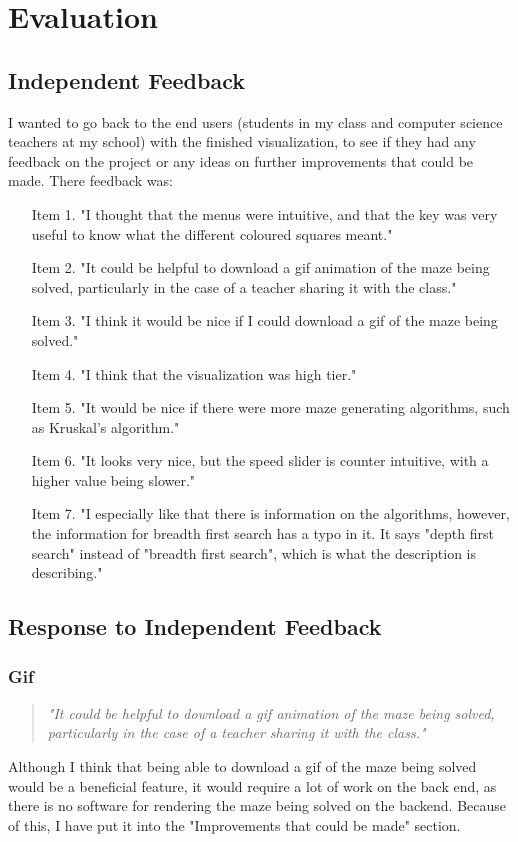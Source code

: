 \documentclass[titlepage]{article}
\begin{document}
\section{Evaluation}
\subsection{Independent Feedback}
I wanted to go back to the end users (students in my class and computer science teachers at my school) with the finished visualization, to see if they had any feedback on the project or any ideas on further improvements that could be made.
There feedback was:
\begin{itemize}
    \item[Item 1.]"I thought that the menus were intuitive, and that the key was very useful to know what the different coloured squares meant."
    \item[Item 2.]"It could be helpful to download a gif animation of the maze being solved, particularly in the case of a teacher sharing it with the class." 
    \item[Item 3.]"I think it would be nice if I could download a gif of the maze being solved."    
    \item[Item 4.]"I think that the visualization was high tier."
    \item[Item 5.]"It would be nice if there were more maze generating algorithms, such as Kruskal's algorithm." 
    \item[Item 6.]"It looks very nice, but the speed slider is counter intuitive, with a higher value being slower."
    \item[Item 7.]"I especially like that there is information on the algorithms, however, the information for breadth first search has a typo in it. It says "depth first search" instead of "breadth first search", which is what the description is describing."   
\end{itemize}
\subsection{Response to Independent Feedback}

\subsubsection{Gif}
\begin{quote}
    \textit{
        "It could be helpful to download a gif animation of the maze being solved, particularly in the case of a teacher sharing it with the class."
    }
\end{quote}
Although I think that being able to download a gif of the maze being solved would be a beneficial feature, it would require a lot of work on the back end, as there is no software for rendering the maze being solved on the backend. Because of this, I have put it into the "Improvements that could be made" section.
\end{document}
